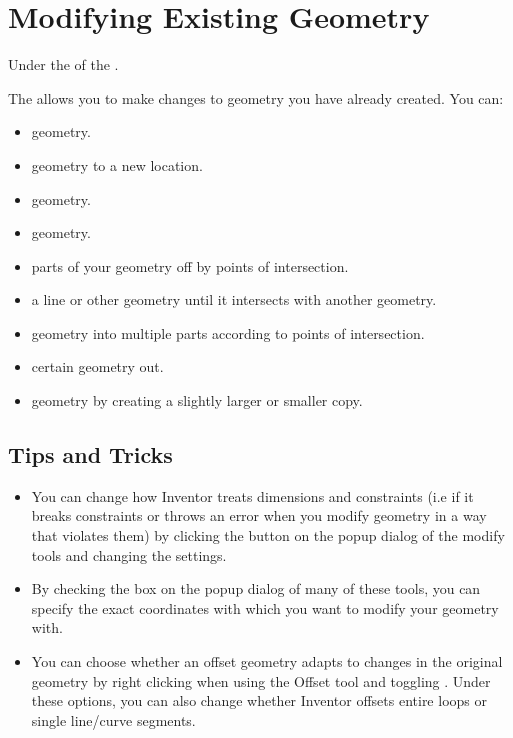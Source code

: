 \section{Modifying Existing Geometry}

\begin{where-to-find}
    Under the  of the .
    \end{where-to-find}    

The  allows you to make changes to geometry you have already created. You can:

\begin{itemize}
\item {} geometry.
\item {} geometry to a new location.
\item {} geometry.
\item {} geometry.
\item {} parts of your geometry off by points of intersection.
\item {} a line or other geometry until it intersects with another geometry.
\item {} geometry into multiple parts according to points of intersection.
\item {} certain geometry out.
\item {} geometry by creating a slightly larger or smaller copy.
\end{itemize}


\subsection{Tips and Tricks}
\mediumdifficulty
\begin{itemize}
\item You can change how Inventor treats dimensions and constraints (i.e if it breaks constraints or throws an error when you modify geometry in a way that violates them) by clicking the \appcommand{\(\gg\)} button on the popup dialog of the modify tools and changing the settings.
\item By checking the  box on the popup dialog of many of these tools, you can specify the exact coordinates with which you want to modify your geometry with.
\item You can choose whether an offset geometry adapts to changes in the original geometry by right clicking when using the Offset tool and toggling . Under these options, you can also change whether Inventor offsets entire loops or single line/curve segments.
\end{itemize}

